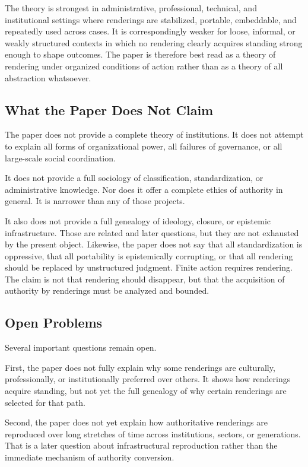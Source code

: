 \documentclass[11pt]{article}
\begin{document}
The theory is strongest in administrative, professional, technical, and institutional settings where renderings are stabilized, portable, embeddable, and repeatedly used across cases. It is correspondingly weaker for loose, informal, or weakly structured contexts in which no rendering clearly acquires standing strong enough to shape outcomes. The paper is therefore best read as a theory of rendering under organized conditions of action rather than as a theory of all abstraction whatsoever.

\subsection{What the Paper Does Not Claim}

The paper does not provide a complete theory of institutions. It does not attempt to explain all forms of organizational power, all failures of governance, or all large-scale social coordination.

It does not provide a full sociology of classification, standardization, or administrative knowledge. Nor does it offer a complete ethics of authority in general. It is narrower than any of those projects.

It also does not provide a full genealogy of ideology, closure, or epistemic infrastructure. Those are related and later questions, but they are not exhausted by the present object.\cite{Swanson2026MediatedJudgmentConstraint,Swanson2026ConstrainedDescribability} Likewise, the paper does not say that all standardization is oppressive, that all portability is epistemically corrupting, or that all rendering should be replaced by unstructured judgment. Finite action requires rendering. The claim is not that rendering should disappear, but that the acquisition of authority by renderings must be analyzed and bounded.

\subsection{Open Problems}

Several important questions remain open.

First, the paper does not fully explain why some renderings are culturally, professionally, or institutionally preferred over others. It shows how renderings acquire standing, but not yet the full genealogy of why certain renderings are selected for that path.

Second, the paper does not yet explain how authoritative renderings are reproduced over long stretches of time across institutions, sectors, or generations. That is a later question about infrastructural reproduction rather than the immediate mechanism of authority conversion.
\end{document}
